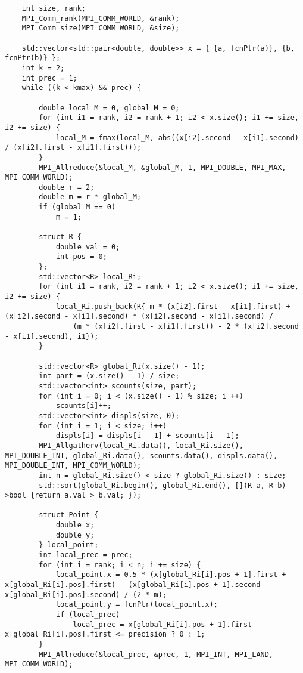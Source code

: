 \documentclass{report}
\begin{document}
\begin{lstlisting}
    int size, rank;
    MPI_Comm_rank(MPI_COMM_WORLD, &rank);
    MPI_Comm_size(MPI_COMM_WORLD, &size);

    std::vector<std::pair<double, double>> x = { {a, fcnPtr(a)}, {b, fcnPtr(b)} };
    int k = 2;
    int prec = 1;
    while ((k < kmax) && prec) {

        double local_M = 0, global_M = 0;
        for (int i1 = rank, i2 = rank + 1; i2 < x.size(); i1 += size, i2 += size) {
            local_M = fmax(local_M, abs((x[i2].second - x[i1].second) / (x[i2].first - x[i1].first)));
        }
        MPI_Allreduce(&local_M, &global_M, 1, MPI_DOUBLE, MPI_MAX, MPI_COMM_WORLD);
        double r = 2;
        double m = r * global_M;
        if (global_M == 0)
            m = 1;

        struct R {
            double val = 0;
            int pos = 0;
        };
        std::vector<R> local_Ri;
        for (int i1 = rank, i2 = rank + 1; i2 < x.size(); i1 += size, i2 += size) {
            local_Ri.push_back(R{ m * (x[i2].first - x[i1].first) + (x[i2].second - x[i1].second) * (x[i2].second - x[i1].second) /
                (m * (x[i2].first - x[i1].first)) - 2 * (x[i2].second - x[i1].second), i1});
        }
        
        std::vector<R> global_Ri(x.size() - 1);
        int part = (x.size() - 1) / size;
        std::vector<int> scounts(size, part);
        for (int i = 0; i < (x.size() - 1) % size; i ++)
            scounts[i]++;
        std::vector<int> displs(size, 0);
        for (int i = 1; i < size; i++)
            displs[i] = displs[i - 1] + scounts[i - 1];
        MPI_Allgatherv(local_Ri.data(), local_Ri.size(), MPI_DOUBLE_INT, global_Ri.data(), scounts.data(), displs.data(), MPI_DOUBLE_INT, MPI_COMM_WORLD);
        int n = global_Ri.size() < size ? global_Ri.size() : size;
        std::sort(global_Ri.begin(), global_Ri.end(), [](R a, R b)->bool {return a.val > b.val; });
        
        struct Point {
            double x;
            double y;
        } local_point;
        int local_prec = prec;
        for (int i = rank; i < n; i += size) {
            local_point.x = 0.5 * (x[global_Ri[i].pos + 1].first + x[global_Ri[i].pos].first) - (x[global_Ri[i].pos + 1].second - x[global_Ri[i].pos].second) / (2 * m);
            local_point.y = fcnPtr(local_point.x);
            if (local_prec)
                local_prec = x[global_Ri[i].pos + 1].first - x[global_Ri[i].pos].first <= precision ? 0 : 1;
        }
        MPI_Allreduce(&local_prec, &prec, 1, MPI_INT, MPI_LAND, MPI_COMM_WORLD);
        

\end{lstlisting}
\end{document}
